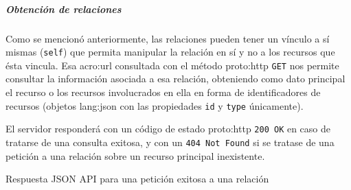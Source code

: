 \subparagraph{Obtención de relaciones}

Como se mencionó anteriormente, las relaciones pueden tener un vínculo a sí mismas (\texttt{self}) que permita manipular la relación en sí y no a los recursos que ésta vincula. Esa \gls{acro:url} consultada con el método \gls{proto:http} \texttt{GET} nos permite consultar la información asociada a esa relación, obteniendo como dato principal el recurso o los recursos involucrados en ella en forma de identificadores de recursos (objetos \gls{lang:json} con las propiedades \texttt{id} y \texttt{type} únicamente).

El servidor responderá con un código de estado \gls{proto:http} \texttt{200 OK} en caso de tratarse de una consulta exitosa, y con un \texttt{404 Not Found} si se tratase de una petición a una relación sobre un recurso principal inexistente.

\begin{listing}
  \caption{Respuesta JSON API para una petición exitosa a una relación}
  \label{soa:tecnologias:json-api:respuesta-200-obtener-relacion}
\end{listing}
